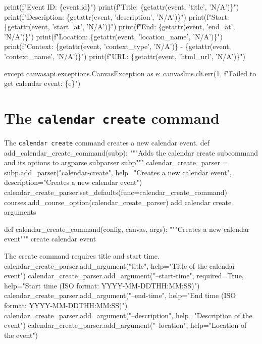   print(f"Event ID: \{event.id\}")
  print(f"Title: \{getattr(event, 'title', 'N/A')\}")
  print(f"Description: \{getattr(event, 'description', 'N/A')\}")
  print(f"Start: \{getattr(event, 'start_at', 'N/A')\}")
  print(f"End: \{getattr(event, 'end_at', 'N/A')\}")
  print(f"Location: \{getattr(event, 'location_name', 'N/A')\}")
  print(f"Context: \{getattr(event, 'context_type', 'N/A')\} - \{getattr(event, 'context_name', 'N/A')\}")
  print(f"URL: \{getattr(event, 'html_url', 'N/A')\}")
  
except canvasapi.exceptions.CanvasException as e:
  canvaslms.cli.err(1, f"Failed to get calendar event: \{e\}")
\nwendcode{}\nwdocspar


\section{The \texttt{calendar create} command}

The \texttt{calendar create} command creates a new calendar event.
\nwenddocs{}\plusendmoddef\nwstartdeflinemarkup{}\nwenddeflinemarkup
def add_calendar_create_command(subp):
  """Adds the calendar create subcommand and its options to argparse subparser subp"""  
  calendar_create_parser = subp.add_parser("calendar-create",
    help="Creates a new calendar event", 
    description="Creates a new calendar event")
  calendar_create_parser.set_defaults(func=calendar_create_command)
  courses.add_course_option(calendar_create_parser)
  \LA{}add calendar create arguments~{\nwtagstyle{}}\RA{}

def calendar_create_command(config, canvas, args):
  """Creates a new calendar event"""
  \LA{}create calendar event~{\nwtagstyle{}}\RA{}
\nwendcode{}\nwdocspar

The create command requires title and start time.
\nwenddocs{}\endmoddef\nwstartdeflinemarkup{}\nwenddeflinemarkup
calendar_create_parser.add_argument("title",
  help="Title of the calendar event")
calendar_create_parser.add_argument("--start-time", required=True,
  help="Start time (ISO format: YYYY-MM-DDTHH:MM:SS)")
calendar_create_parser.add_argument("--end-time",
  help="End time (ISO format: YYYY-MM-DDTHH:MM:SS)")
calendar_create_parser.add_argument("--description", 
  help="Description of the event")
calendar_create_parser.add_argument("--location",
  help="Location of the event")
\nwendcode{}\nwdocspar

